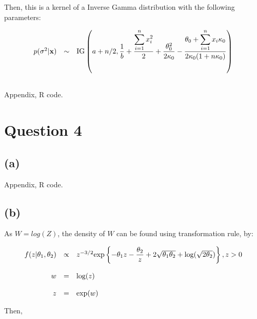 \documentclass{article}
\begin{document}
Then, this is a kernel of a Inverse Gamma distribution with the following parameters:

\begin{equation*}
\begin{array}{lcl ll }

p(\sigma^2|\textbf{x}) & \sim &  \mbox{IG}\left( a+n/2, \dfrac{1}{b} + \dfrac{\displaystyle\sum_{i=1}^{n}x_{i}^2}{2} + \dfrac{\theta_0^2}{2\kappa_0} - \dfrac{\theta_0 + \displaystyle\sum_{i=1}^{n}x_{i}\kappa_0}{2\kappa_0(1+n\kappa_0)}  \right)  \\\\

 \end{array}
\end{equation*}

Appendix, R code.

\section{Question 4}

\subsection{(a)}
Appendix, R code.

\subsection{(b)}

As $W=log(Z)$, the density of $W$ can be found using transformation rule, by:

\begin{equation*}
\begin{array}{rll ll }

f(z|\theta_1,\theta_2) & \propto &  z^{-3/2} \mbox{exp} \left\{ -\theta_1 z  -\dfrac{\theta_2}{z} + 2\sqrt{\theta_1\theta_2} + \mbox{log}(\sqrt{2\theta_2}) \right\}, z>0 \\\\

w & = & \mbox{log}(z) \\ \\ 

z & = & \mbox{exp}(w) \\
 \end{array}
\end{equation*}

Then,
\end{document}

